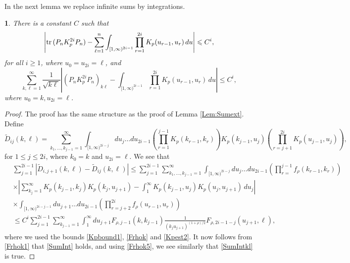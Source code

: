 \documentclass{article}
\numberwithin{equation}{section}
\numberwithin{figure}{section}
\theoremstyle{plain}
\theoremstyle{plain}
\newtheorem{lemma}[thm]{\protect\lemmaname}
\numberwithin{thm}{section}
\theoremstyle{remark}
\providecommand{\lemmaname}{Lemma}
\newcommand{\Tr}{\text{{\rm tr\,}}}
\let \le \leqslant
\let \ge \geqslant
\begin{document}
In the next lemma we replace infinite sums by integrations.

\begin{lemma}\label{Lem:SumInt}
There is a constant $C$ such that 
\begin{equation}\label{SumInt}
\left|\Tr (P_nK_p^{2i}P_n)-\sum_{\ell=1}^n\int_{[1,\infty)^{2i-1}}\prod_{r=1}^{2i}K_p(u_{r-1},u_r)\,du\right|\le C^i,
\end{equation}
for all $i\ge 1$, where $u_0=u_{2i}=\ell$, and
\begin{equation}\label{SumIntkl}
 \sum_{k,\ell=1}^\infty\frac{1}{\sqrt{k\ell}}\left|(P_nK_p^{2i}P_n)_{k\ell}- \int_{[1,\infty)^{2i-1}} \prod_{r=1}^{2i}K_p(u_{r-1},u_r)\,du\right|\le C^i, 
\end{equation}
where $u_0=k, u_{2i}=\ell$.
\end{lemma}

\begin{proof}
The proof has the same structure as the proof of Lemma \ref{Lem:Sumext}. Define
\begin{equation*}
\tilde{D}_{ij}(k,\ell)=\sum_{k_1,\dots,k_{j-1}=1}^\infty\int_{[1,\infty)^{2i-j}}du_j\dots du_{2i-1}\left(\prod_{r=1}^{j-1}K_p(k_{r-1},k_r)\right)K_p(k_{j-1},u_j)
\left(\prod_{r=j+1}^{2i}K_p(u_{j-1},u_j)\right),
\end{equation*}
for $1\le j\le 2i$, where $k_0=k$ and $u_{2i}=\ell$. We see that
\begin{align*}
    &\sum_{j=1}^{2i-1} |\tilde{D}_{i,j+1}(k,\ell)-\tilde{D}_{ij}(k,\ell)|
    \le \sum_{j=1}^{2i-1}\sum_{k_1,\dots,k_{j-1}=1}^\infty\int_{[1,\infty)^{2i-j}}du_j\dots du_{2i-1}
    \left(\prod_{r=}^{j-1}f_\rho(k_{r-1},k_r)\right) \\ &\times \left|\sum_{k_j=1}^\infty K_p(k_{j-1},k_j)K_p(k_j,u_{j+1})- \int_1^\infty K_p(k_{j-1},u_j)K_p(u_j,u_{j+1})\,du_j\right|\\
    &\times\int_{[1,\infty)^{2i-j-1}}du_{j+1}\dots du_{2i-1}\left(\prod_{r=j+2}^{2i}f_\rho(u_{r-1},u_r)\right)\\
    &\le C^i \sum_{j=1}^{2i-1}\sum_{k_{j-1}=1}^\infty\int_1^\infty du_{j+1}F_{\rho,j-1}(k,k_{j-1})\frac 1{(k_j u_{j+1})^{(1+\rho)/2}}F_{\rho,2i-1-j}(u_{j+1},\ell),
\end{align*}
where we used the bounds \eqref{Kpbound1}, \eqref{Frhok} and \eqref{Kpest2}. It now follows from \eqref{Frhok1} that \eqref{SumInt} holds, and using \eqref{Frhok5}, we see similarly that \eqref{SumIntkl} is true.
\end{proof}
\end{document}
